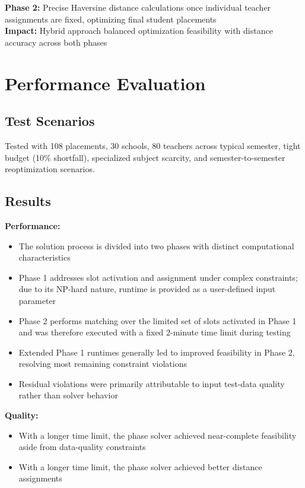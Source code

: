 \documentclass[12pt,a4paper]{report}
\begin{document}
\textbf{Phase 2:} Precise Haversine distance calculations once individual teacher assignments are fixed, optimizing final student placements
\\
\textbf{Impact:} Hybrid approach balanced optimization feasibility with distance accuracy across both phases

\section{Performance Evaluation}

\subsection{Test Scenarios}

Tested with 108 placements, 30 schools, 80 teachers across typical semester, tight budget (10\% shortfall), specialized subject scarcity, and semester-to-semester reoptimization scenarios.

\subsection{Results}

\textbf{Performance:}
\begin{itemize}
\item The solution process is divided into two phases with distinct computational characteristics
\item Phase 1 addresses slot activation and assignment under complex constraints; due to its NP-hard nature, runtime is provided as a user-defined input parameter
\item Phase 2 performs matching over the limited set of slots activated in Phase 1 and was therefore executed with a fixed 2-minute time limit during testing
\item Extended Phase 1 runtimes generally led to improved feasibility in Phase 2, resolving most remaining constraint violations
\item Residual violations were primarily attributable to input test-data quality rather than solver behavior
\end{itemize}

\textbf{Quality:}
\begin{itemize}
    \item With a longer time limit, the phase solver achieved near-complete feasibility aside from data-quality constraints
    \item With a longer time limit, the phase solver achieved better distance assignments
\end{itemize}
\end{document}
